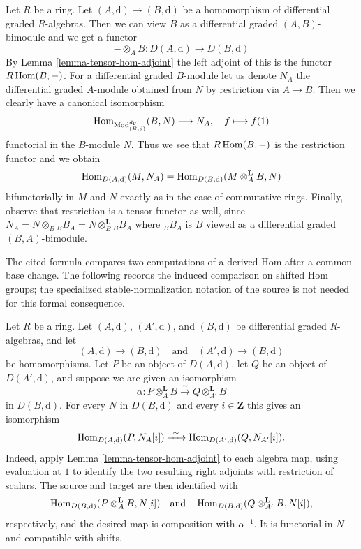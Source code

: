 \begin{example}
\label{example-map-hom-tensor}
Let $R$ be a ring. Let $(A, \text{d}) \to (B, \text{d})$ be a
homomorphism of differential graded $R$-algebras. Then we can
view $B$ as a differential graded $(A, B)$-bimodule and we get a functor
$$
- \otimes_A B : D(A, \text{d}) \longrightarrow D(B, \text{d})
$$
By Lemma \ref{lemma-tensor-hom-adjoint} the left adjoint of this
is the functor $R\mathop{\mathrm{Hom}}\nolimits(B, -)$. For a differential graded $B$-module
let us denote $N_A$ the differential graded $A$-module obtained
from $N$ by restriction via $A \to B$. Then we clearly have
a canonical isomorphism
$$
\mathop{\mathrm{Hom}}\nolimits_{\text{Mod}^{dg}_{(B, \text{d})}}(B, N) \longrightarrow N_A,\quad
f \longmapsto f(1)
$$
functorial in the $B$-module $N$. Thus we see that
$R\mathop{\mathrm{Hom}}\nolimits(B, -)$ is the restriction functor and we obtain
$$
\mathop{\mathrm{Hom}}\nolimits_{D(A, \text{d})}(M, N_A) =
\mathop{\mathrm{Hom}}\nolimits_{D(B, \text{d})}(M \otimes^\mathbf{L}_A B, N)
$$
bifunctorially in $M$ and $N$ exactly as in the case of commutative rings.
Finally, observe that restriction is a tensor functor as well,
since $N_A = N \otimes_B {}_BB_A = N \otimes_B^\mathbf{L} {}_BB_A$
where ${}_BB_A$ is $B$ viewed as a differential graded $(B, A)$-bimodule.
\end{example}

\begin{example}
\label{example-two-presentations-derived-hom}
\begin{reference}
\cite[II, Section 11.5.1, Equation (11.5.1.7), p. 175]{cotangent}
\end{reference}
\begin{history}
The cited formula compares two computations of a derived Hom after a common
base change. The following records the induced comparison on shifted Hom
groups; the specialized stable-normalization notation of the source is not
needed for this formal consequence.
\end{history}
Let $R$ be a ring. Let $(A, \text{d})$, $(A', \text{d})$, and
$(B, \text{d})$ be differential graded $R$-algebras, and let
$$
(A, \text{d}) \longrightarrow (B, \text{d})
\quad\text{and}\quad
(A', \text{d}) \longrightarrow (B, \text{d})
$$
be homomorphisms. Let $P$ be an object of $D(A, \text{d})$, let $Q$ be
an object of $D(A', \text{d})$, and suppose we are given an isomorphism
$$
\alpha : P \otimes_A^\mathbf{L} B
\xrightarrow{\ \sim\ } Q \otimes_{A'}^\mathbf{L} B
$$
in $D(B, \text{d})$. For every $N$ in $D(B, \text{d})$ and every
$i \in \mathbf{Z}$ this gives an isomorphism
$$
\mathop{\mathrm{Hom}}\nolimits_{D(A, \text{d})}(P, N_A[i])
\xrightarrow{\ \sim\ }
\mathop{\mathrm{Hom}}\nolimits_{D(A', \text{d})}(Q, N_{A'}[i]).
$$
Indeed, apply Lemma \ref{lemma-tensor-hom-adjoint} to each algebra map, using
evaluation at $1$ to identify the two resulting right adjoints with restriction
of scalars. The source and target are then identified with
$$
\mathop{\mathrm{Hom}}\nolimits_{D(B, \text{d})}(P \otimes_A^\mathbf{L} B, N[i])
\quad\text{and}\quad
\mathop{\mathrm{Hom}}\nolimits_{D(B, \text{d})}(Q \otimes_{A'}^\mathbf{L} B, N[i]),
$$
respectively, and the desired map is composition with $\alpha^{-1}$.
It is functorial in $N$ and compatible with shifts.
\end{example}

